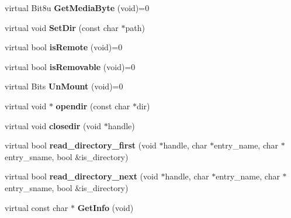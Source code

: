 \begin{DoxyCompactItemize}
\item 
\hypertarget{classDOS__Drive_a344fbf135d82e7330c309c9b7dfad7e8}{virtual Bit8u {\bfseries Get\-Media\-Byte} (void)=0}\label{classDOS__Drive_a344fbf135d82e7330c309c9b7dfad7e8}

\item 
\hypertarget{classDOS__Drive_a60dbe76d92bff85e197fc51cc433f0e3}{virtual void {\bfseries Set\-Dir} (const char $\ast$path)}\label{classDOS__Drive_a60dbe76d92bff85e197fc51cc433f0e3}

\item 
\hypertarget{classDOS__Drive_afe789aa0e61388914c4ab1d73ff591d9}{virtual bool {\bfseries is\-Remote} (void)=0}\label{classDOS__Drive_afe789aa0e61388914c4ab1d73ff591d9}

\item 
\hypertarget{classDOS__Drive_a6931988116a287679e700e30083ec9de}{virtual bool {\bfseries is\-Removable} (void)=0}\label{classDOS__Drive_a6931988116a287679e700e30083ec9de}

\item 
\hypertarget{classDOS__Drive_aef7bc7c1cbf09e4fe88ee8bc7435db07}{virtual Bits {\bfseries Un\-Mount} (void)=0}\label{classDOS__Drive_aef7bc7c1cbf09e4fe88ee8bc7435db07}

\item 
\hypertarget{classDOS__Drive_ae382ad86607e9926893e78af7231ec61}{virtual void $\ast$ {\bfseries opendir} (const char $\ast$dir)}\label{classDOS__Drive_ae382ad86607e9926893e78af7231ec61}

\item 
\hypertarget{classDOS__Drive_af52e4214f17f23c70751df925582ba12}{virtual void {\bfseries closedir} (void $\ast$handle)}\label{classDOS__Drive_af52e4214f17f23c70751df925582ba12}

\item 
\hypertarget{classDOS__Drive_ad55c8cdb5a525576f78e6908a3f60179}{virtual bool {\bfseries read\-\_\-directory\-\_\-first} (void $\ast$handle, char $\ast$entry\-\_\-name, char $\ast$entry\-\_\-sname, bool \&is\-\_\-directory)}\label{classDOS__Drive_ad55c8cdb5a525576f78e6908a3f60179}

\item 
\hypertarget{classDOS__Drive_a6e5f92849f612dfaa5c00ebfb2ecdf1c}{virtual bool {\bfseries read\-\_\-directory\-\_\-next} (void $\ast$handle, char $\ast$entry\-\_\-name, char $\ast$entry\-\_\-sname, bool \&is\-\_\-directory)}\label{classDOS__Drive_a6e5f92849f612dfaa5c00ebfb2ecdf1c}

\item 
\hypertarget{classDOS__Drive_a64bf9af6eca73f8071c109a2d4c25d02}{virtual const char $\ast$ {\bfseries Get\-Info} (void)}\label{classDOS__Drive_a64bf9af6eca73f8071c109a2d4c25d02}


\end{DoxyCompactItemize}
